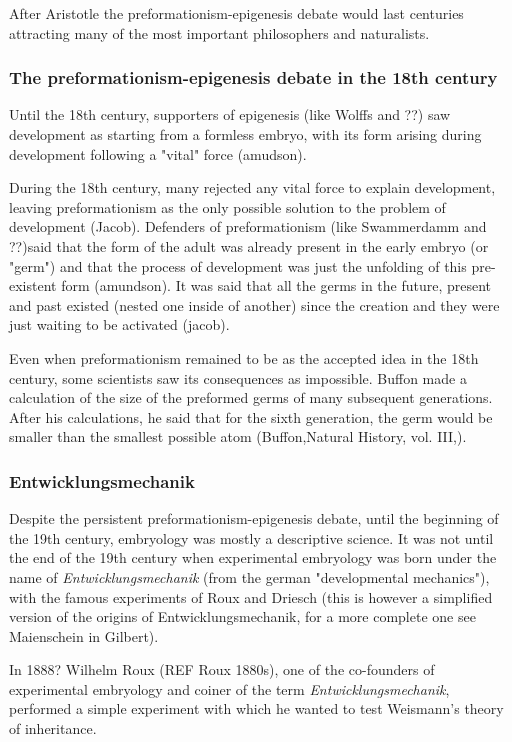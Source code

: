 After Aristotle the preformationism-epigenesis debate would last centuries attracting many of the most important philosophers and naturalists.

\subsubsection{The preformationism-epigenesis debate in the 18th century}

Until the 18th century, supporters of epigenesis (like Wolffs and ??) saw development as starting from a formless embryo, with its form arising during development following a "vital" force (amudson).

During the 18th century, many rejected any vital force to explain development, leaving preformationism as the only possible solution to the problem of development (Jacob). Defenders of preformationism (like Swammerdamm and ??)said that the form of the adult was already present in the early embryo (or "germ") and that the process of development was just the unfolding of this pre-existent form (amundson). 
It was said that all the germs in the future, present and past existed (nested one inside of another) since the creation and they were just waiting to be activated (jacob).

Even when preformationism remained to be as the accepted idea in the 18th century, some scientists saw its consequences as impossible. Buffon made a calculation of the size of the preformed germs of many subsequent generations. After his calculations, he said that for the sixth generation, the germ would be smaller than the smallest possible atom (Buffon,Natural History, vol. III,).


\subsubsection{Entwicklungsmechanik}

Despite the persistent preformationism-epigenesis debate, until the beginning of the 19th century, embryology was mostly a descriptive science. It was not until the end of the 19th century when experimental embryology was born under the name of \textit{Entwicklungsmechanik} (from the german "developmental mechanics"), with the famous experiments of Roux and Driesch (this is however a simplified version of the origins of Entwicklungsmechanik, for a more complete one see Maienschein in Gilbert).

In 1888? Wilhelm Roux (REF Roux 1880s), one of the co-founders of experimental embryology and coiner of the term \textit{Entwicklungsmechanik}, performed a simple experiment with which he wanted to test Weismann's theory of inheritance.

